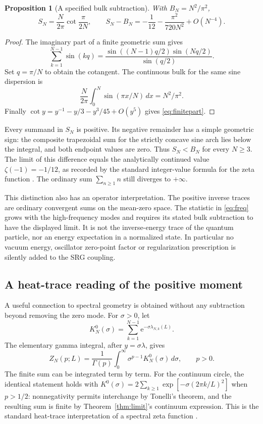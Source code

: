 \documentclass[11pt,a4paper]{article}
\newtheorem{proposition}[theorem]{Proposition}
\theoremstyle{definition}\newtheorem{definition}[theorem]{Definition}
\theoremstyle{remark}\newtheorem{remark}[theorem]{Remark}
\newcommand{\ee}{\mathrm e}\newcommand{\ii}{\mathrm i}
\numberwithin{equation}{section}
\begin{document}
\begin{proposition}[A specified bulk subtraction]\label{prop:finitepart}
With \(B_N=N^2/\pi^2\),
\begin{equation}
 S_N=\frac N{2\pi}\cot\frac{\pi}{2N},\qquad
 S_N-B_N=-\frac1{12}-\frac{\pi^2}{720N^2}+O(N^{-4}).
 \label{eq:finitepart}
\end{equation}
\end{proposition}
\begin{proof}
The imaginary part of a finite geometric sum gives
\[
 \sum_{k=1}^{N-1}\sin(kq)
 =\frac{\sin((N-1)q/2)\sin(Nq/2)}{\sin(q/2)}.
\]
Set \(q=\pi/N\) to obtain the cotangent.
The continuous bulk for the same sine dispersion is
\[
 \frac N{2\pi}\int_0^N\sin(\pi x/N)\,dx=N^2/\pi^2.
\]
Finally \(\cot y=y^{-1}-y/3-y^3/45+O(y^5)\) gives
\eqref{eq:finitepart}.
\end{proof}

Every summand in \(S_N\) is positive. Its negative remainder has a simple
geometric sign: the composite trapezoidal sum for the strictly concave
sine arch lies below the integral, and both endpoint values are zero.
Thus \(S_N<B_N\) for every \(N\geq3\).
The limit of this difference equals the analytically continued value
\(\zeta(-1)=-1/12\), as recorded by the standard integer-value formula
for the zeta function \cite[Eq.~25.6.3]{dlmf}.
The ordinary sum \(\sum_{n\geq1}n\) still diverges to \(+\infty\).

This distinction also has an operator interpretation. The positive
inverse traces are ordinary convergent sums on the mean-zero space.
The statistic in \eqref{eq:freq} grows with the high-frequency modes and
requires its stated bulk subtraction to have the displayed limit.
It is not the inverse-energy trace of the quantum particle, nor an
energy expectation in a normalized state.
In particular no vacuum energy, oscillator zero-point factor or
regularization prescription is silently added to the SRG coupling.

\subsection{A heat-trace reading of the positive moment}
A useful connection to spectral geometry is obtained without any
subtraction beyond removing the zero mode. For \(\sigma>0\), let
\[
 K_N^0(\sigma)=\sum_{k=1}^{N-1}\ee^{-\sigma\lambda_{N,k}(L)}.
\]
The elementary gamma integral, after \(y=\sigma\lambda\), gives
\begin{equation}
 Z_N(p;L)=\frac1{\Gamma(p)}
     \int_0^\infty \sigma^{p-1}K_N^0(\sigma)\,d\sigma,\qquad p>0.
 \label{eq:mellin}
\end{equation}
The finite sum can be integrated term by term.
For the continuum circle, the identical statement holds with
\(K^0(\sigma)=2\sum_{k\geq1}\exp[-\sigma(2\pi k/L)^2]\)
when \(p>1/2\): nonnegativity permits interchange by Tonelli's theorem,
and the resulting sum is finite by Theorem~\ref{thm:limit}'s
continuum expression. This is the standard heat-trace interpretation
of a spectral zeta function \cite[section 2.1]{karlsson}.
\end{document}
